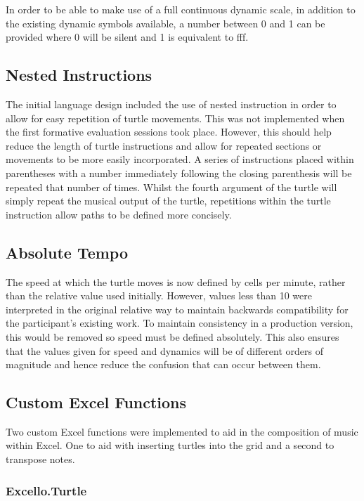 In order to be able to make use of a full continuous dynamic scale, in addition to the existing dynamic symbols available, a number between 0 and 1 can be provided where 0 will be silent and 1 is equivalent to fff.

\subsection{Nested Instructions}

The initial language design included the use of nested instruction in order to allow for easy repetition of turtle movements. This was not implemented when the first formative evaluation sessions took place. However, this should help reduce the length of turtle instructions and allow for repeated sections or movements to be more easily incorporated. A series of instructions placed within parentheses with a number immediately following the closing parenthesis will be repeated that number of times. Whilst the fourth argument of the turtle will simply repeat the musical output of the turtle, repetitions within the turtle instruction allow paths to be defined more concisely.

\subsection{Absolute Tempo}

The speed at which the turtle moves is now defined by cells per minute, rather than the relative value used initially. However, values less than 10 were interpreted in the original relative way to maintain backwards compatibility for the participant's existing work. To maintain consistency in a production version, this would be removed so speed must be defined absolutely. This also ensures that the values given for speed and dynamics will be of different orders of magnitude and hence reduce the confusion that can occur between them.

\subsection{Custom Excel Functions}

Two custom Excel functions were implemented to aid in the composition of music within Excel. One to aid with inserting turtles into the grid and a second to transpose notes.

\subsubsection{Excello.Turtle}

